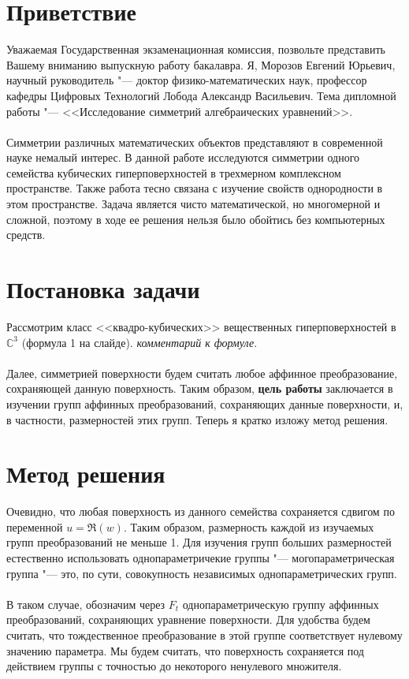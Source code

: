 \documentclass[a4paper,14pt]{extarticle}
\begin{document}
\section{Приветствие}
Уважаемая Государственная экзаменационная комиссия, позвольте представить Вашему вниманию выпускную работу бакалавра. Я, Морозов Евгений Юрьевич, научный руководитель "--- доктор физико-математических наук, профессор кафедры Цифровых Технологий Лобода Александр Васильевич. Тема дипломной работы "--- <<Исследование симметрий алгебраических уравнений>>.
\\~\\
Симметрии различных математических объектов представляют в современной науке немалый интерес. В данной работе исследуются симметрии одного семейства кубических гиперповерхностей в трехмерном комплексном пространстве. Также работа тесно связана с изучение свойств однородности в этом пространстве. Задача является чисто математической, но многомерной и сложной, поэтому в ходе ее решения нельзя было обойтись без компьютерных средств.


\section{Постановка задачи}
Рассмотрим класс <<квадро-кубических>> вещественных гиперповерхностей в $\mathbb{C}^3$ (формула 1 на слайде). \textit{комментарий к формуле}.
\\~\\
Далее, симметрией поверхности будем считать любое аффинное преобразование, сохраняющей данную поверхность. Таким образом, \textbf{цель работы} заключается в изучении групп аффинных преобразований, сохраняющих данные поверхности, и, в частности, размерностей этих групп. Теперь я кратко изложу метод решения.

\section{Метод решения}
Очевидно, что любая поверхность из данного семейства сохраняется сдвигом по переменной $u = \Re(w)$. Таким образом, размерность каждой из изучаемых групп преобразований не меньше 1. Для изучения групп больших размерностей естественно использовать однопараметричекие группы "--- могопараметрическая группа "--- это, по сути, совокупность независимых однопараметрических групп.
\\~\\
В таком случае, обозначим через $F_t$ однопараметрическую группу аффинных преобразований, сохраняющих уравнение поверхности. Для удобства будем считать, что тождественное преобразование в этой группе соответствует нулевому значению параметра. Мы будем считать, что поверхность сохраняется под действием группы с точностью до некоторого ненулевого множителя.
\end{document}
